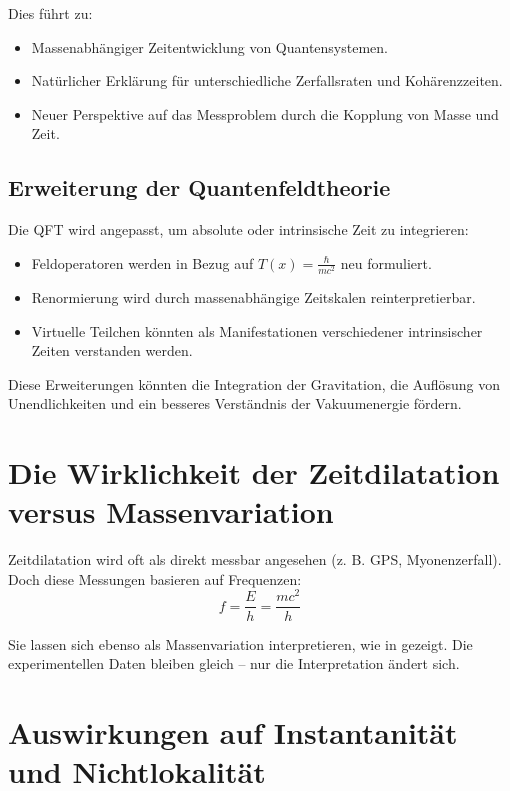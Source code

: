\documentclass[a4paper,12pt]{article}
\newcommand{\Tfield}{T(x)}
\begin{document}
	Dies führt zu:
	\begin{itemize}
		\item Massenabhängiger Zeitentwicklung von Quantensystemen.
		\item Natürlicher Erklärung für unterschiedliche Zerfallsraten und Kohärenzzeiten.
		\item Neuer Perspektive auf das Messproblem durch die Kopplung von Masse und Zeit.
	\end{itemize}
	
	\subsection{Erweiterung der Quantenfeldtheorie}
	
	Die QFT wird angepasst, um absolute oder intrinsische Zeit zu integrieren:
	\begin{itemize}
		\item Feldoperatoren werden in Bezug auf \(\Tfield = \frac{\hbar}{m c^2}\) neu formuliert.
		\item Renormierung wird durch massenabhängige Zeitskalen reinterpretierbar.
		\item Virtuelle Teilchen könnten als Manifestationen verschiedener intrinsischer Zeiten verstanden werden.
	\end{itemize}
	
	Diese Erweiterungen könnten die Integration der Gravitation, die Auflösung von Unendlichkeiten und ein besseres Verständnis der Vakuumenergie fördern.
	
	\section{Die Wirklichkeit der Zeitdilatation versus Massenvariation}
	
	Zeitdilatation wird oft als direkt messbar angesehen (z. B. GPS, Myonenzerfall). Doch diese Messungen basieren auf Frequenzen:
	\begin{equation}
		f = \frac{E}{h} = \frac{m c^2}{h}
	\end{equation}
	
	Sie lassen sich ebenso als Massenvariation interpretieren, wie in \cite{pascher_planck_2025} gezeigt. Die experimentellen Daten bleiben gleich – nur die Interpretation ändert sich.
	
	\section{Auswirkungen auf Instantanität und Nichtlokalität}
	
\end{document}
